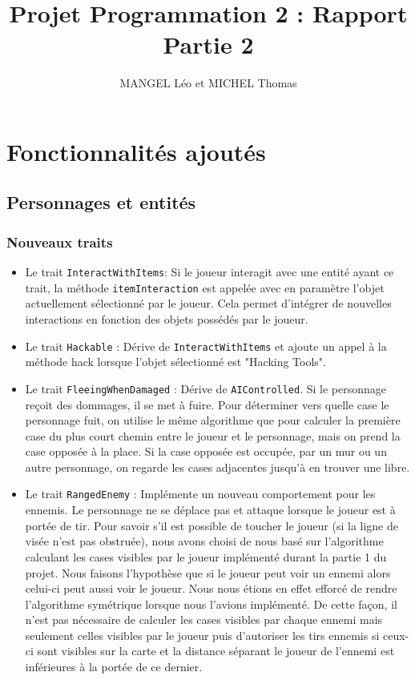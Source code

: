 \documentclass[10pt,a4paper]{article}
\title{Projet Programmation 2 : Rapport Partie 2}
\author{MANGEL Léo et MICHEL Thomas}
\date{}
\begin{document}
\maketitle

\section{Fonctionnalités ajoutés}

\subsection{Personnages et entités}
\subsubsection{Nouveaux traits}
\begin{itemize}
	\item Le trait \texttt{InteractWithItems}: Si le joueur interagit avec une entité ayant ce trait, la méthode \texttt{itemInteraction} est appelée avec en paramètre l'objet actuellement sélectionné par le joueur. Cela permet d'intégrer de nouvelles interactions en fonction des objets possédés par le joueur.
    \item Le trait \texttt{Hackable} : Dérive de \texttt{InteractWithItems} et ajoute un appel à la méthode hack lorsque l'objet sélectionné est "Hacking Tools".
    \item Le trait \texttt{FleeingWhenDamaged} : Dérive de \texttt{AIControlled}. Si le personnage reçoit des dommages, il se met à fuire. Pour déterminer vers quelle case le personnage fuit, on utilise le même algorithme que pour calculer la première case du plus court chemin entre le joueur et le personnage, mais on prend la case opposée à la place. Si la case opposée est occupée, par un mur ou un autre personnage, on regarde les cases adjacentes jusqu'à en trouver une libre.
    \item Le trait \texttt{RangedEnemy} : Implémente un nouveau comportement pour les ennemis. Le personnage ne se déplace pas et attaque lorsque le joueur est à portée de tir. Pour savoir s'il est possible de toucher le joueur (si la ligne de visée n'est pas obstruée), nous avons choisi de nous basé sur l'algorithme calculant les cases visibles par le joueur implémenté durant la partie 1 du projet. Nous faisons l'hypothèse que si le joueur peut voir un ennemi alors celui-ci peut aussi voir le joueur. Nous nous étions en effet efforcé de rendre l'algorithme symétrique lorsque nous l'avions implémenté. De cette façon, il n'est pas nécessaire de calculer les cases visibles par chaque ennemi mais seulement celles visibles par le joueur puis d'autoriser les tirs ennemis si ceux-ci sont visibles sur la carte et la distance séparant le joueur de l'ennemi est inférieures à la portée de ce dernier.
\end{itemize}
\end{document}
